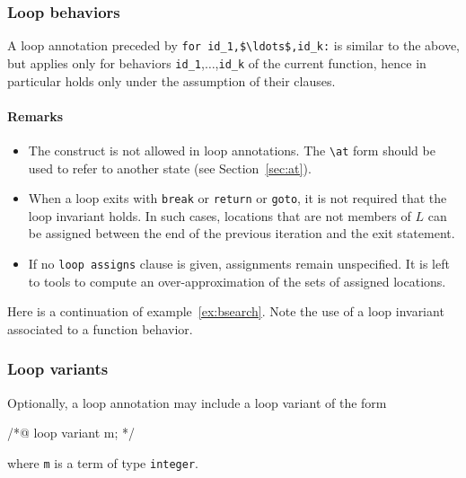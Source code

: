 \subsubsection{Loop behaviors}
A loop annotation preceded by
\lstinline|for id_1,$\ldots$,id_k:| is similar to the above, but
applies only for behaviors \lstinline|id_1|,$\ldots$,\lstinline|id_k|
of the current function,
hence in particular holds only under the assumption of their \assumes
clauses.


\paragraph{Remarks}
\begin{itemize}
\item The \old{} construct is not allowed
  in loop annotations. The \lstinline|\at| form should be used to
  refer to another state (see Section~\ref{sec:at}).
\item When a loop exits with \lstinline{break} or \lstinline{return} or
  \lstinline{goto}, it is not required that the loop invariant holds.
  In such cases, locations that are not members of $L$ can be
  assigned between the end of the previous iteration and the exit statement.
\item If no \lstinline{loop assigns}
  clause is given, assignments remain unspecified.
  It is left to tools to compute an over-approximation of the sets
  of assigned locations.
\end{itemize}

\begin{example}
\label{ex:bsearch2}
Here is a continuation of example~\ref{ex:bsearch}. Note the use of
a loop invariant associated to a function behavior.


\end{example}

\subsubsection{Loop variants}\label{sec:loop-variant}

Optionally, a loop annotation may include a loop variant of the form
\begin{listing-nonumber}
/*@ loop variant m; */
\end{listing-nonumber}
where \lstinline|m| is a term of type \lstinline|integer|.

